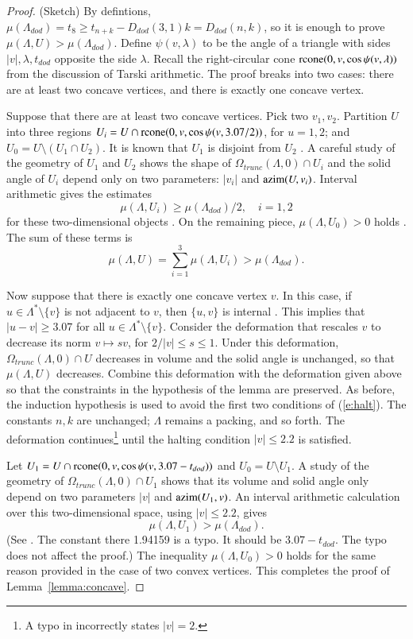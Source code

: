 \begin{proof} (Sketch)  By defintions,
$\mu(\Lambda_{dod}) = t_8 \ge t_{n+k} - D_{dod}(3,1)k = D_{dod}(n,k)$, so it is
enough to prove $\mu(\Lambda,U) > \mu(\Lambda_{dod})$. 
Define $\psi(v,\lambda)$ to be the angle of a triangle with sides $|v|,\lambda,t_{dod}$
opposite the side $\lambda$.  Recall the right-circular cone 
${\operatorname{rcone}}(0,v,\cos\psi(v,\lambda))$ from the discussion of Tarski arithmetic.
The proof breaks into two
cases: there are at least two concave vertices, and there is exactly one concave vertex.

Suppose that there are at least two concave vertices.  Pick two $v_1,v_2$.
Partition $U$ into three
regions $U_i = U\cap {\operatorname{rcone}}(0,v,\cos\psi(v,3.07/2))$, for $u=1,2$; and
$U_0= U\setminus (U_1\cap U_2)$.  It is known that
$U_1$ is disjoint from $U_2$ \cite[Lemma~3.7]{arx}.   A careful study of the geometry
of $U_1$ and $U_2$ shows the shape of $\Omega_{trunc}(\Lambda,0)\cap U_i$ and the
solid angle of $U_i$ depend only
on two parameters: $|v_i|$ and ${\operatorname{azim}}(U,v_i)$.  Interval arithmetic gives
the estimates
  $$\mu(\Lambda,U_i) \ge \mu(\Lambda_{dod})/2,\quad i=1,2$$
for these two-dimensional objects \cite[\S7.2.6]{arx}.  On the remaining piece, $\mu(\Lambda,U_0)>0$ holds
\cite[p.138]{DCG}.  The sum of these terms is
  $$
  \mu(\Lambda,U) = \sum_{i=1}^3 \mu(\Lambda,U_i) > \mu(\Lambda_{dod}).
  $$

Now suppose that there is exactly one concave vertex $v$.  In this case, if $u\in\Lambda^*\setminus\{v\}$
is not adjacent to $v$, then $\{u,v\}$ is internal \cite[p.140]{DCG}.  This implies
that $|u-v|\ge 3.07$ for all $u\in\Lambda^*\setminus\{v\}$.
Consider the deformation that rescales $v$ to decrease its norm $v\mapsto s v$, for 
$2/|v|\le s\le 1$. Under this deformation, $\Omega_{trunc}(\Lambda,0)\cap U$ decreases
in volume and the solid angle is unchanged, so that $\mu(\Lambda,U)$ decreases.
Combine this deformation with the deformation given above so that the
constraints in the hypothesis of the lemma are preserved.  As before, the induction
hypothesis is used to avoid the first two conditions of (\ref{e:halt}).
The constants $n,k$ are unchanged; $\Lambda$ remains a packing, and so forth.
The deformation continues\footnote{A typo in \cite{arx}  incorrectly states $|v|=2$.} until the halting condition $|v|\le 2.2$ is satisfied. 

Let $U_1 = U\cap {\operatorname{rcone}}(0,v,\cos\psi(v,3.07-t_{dod}))$ and $U_0 = U
\setminus U_1$.  A study of the geometry of $\Omega_{trunc}(\Lambda,0)
\cap U_1$ shows that its volume and solid angle only depend 
on two parameters $|v|$ and
${\operatorname{azim}}(U_1,v)$.  An interval arithmetic calculation over this
two-dimensional space, using $|v|\le 2.2$, gives
$$
\mu(\Lambda,U_1) > \mu(\Lambda_{dod}).
$$
(See \cite[\S7.2.6]{arx}. The constant there 1.94159 is a typo.
It should be $3.07-t_{dod}$.  The typo does not affect the proof.)
The inequality $\mu(\Lambda,U_0)>0$ holds for the same reason provided
in the case of two convex vertices.  This completes
the proof of Lemma~\ref{lemma:concave}.
\end{proof}


